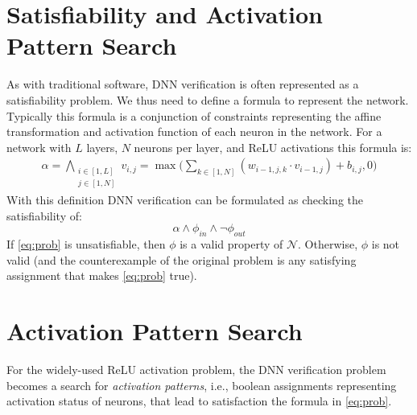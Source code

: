 \documentclass[oneside,11pt,dvipsnames]{book}
\begin{document}


\section{Satisfiability and Activation Pattern Search}\label{sec:satisfiability-and-activation-pattern-search}

 As with traditional software, DNN verification is often represented as a satisfiability problem.
We thus need to define a formula to represent the network. Typically this formula is a conjunction of constraints representing the affine transformation and activation function of each neuron in the network.
For a network with $L$ layers, $N$ neurons per layer, and ReLU activations this formula is:
\begin{align*}
\alpha = \bigwedge_{\begin{smallmatrix}i \in [1,L]\\ j \in [1,N]\end{smallmatrix}} v_{i,j} = \max \Big( \sum_{k \in [1,N]} (w_{i-1,j,k} \cdot v_{i-1,j}) + b_{i,j}, 0 \Big)
\end{align*}
With this definition DNN verification can be formulated as checking the satisfiability of:
\begin{equation}\label{eq:prob}
  \alpha \land \phi_{in} \land \neg \phi_{out}
\end{equation}
If \autoref{eq:prob} is unsatisfiable, then $\phi$ is a valid property of $\mathcal{N}$. Otherwise, $\phi$ is not valid (and the counterexample of the original problem is any satisfying assignment that makes \autoref{eq:prob} true).


\section{Activation Pattern Search} For the widely-used ReLU activation problem, the DNN verification problem becomes a search for \emph{activation patterns}, i.e., boolean assignments representing activation status of neurons, that lead to satisfaction the formula in \autoref{eq:prob}. 
\end{document}
